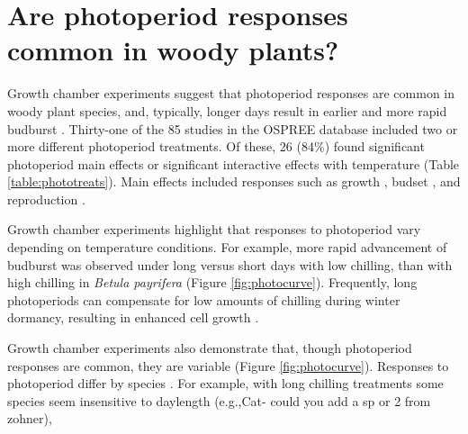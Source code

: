 \documentclass{article}
\begin{document}
\section*{Are photoperiod responses common in woody plants?}
\par Growth chamber experiments suggest that photoperiod responses are common in woody plant species, and, typically, longer days result in earlier and more rapid budburst \citep [e.g., ][]{Caffarra:2011a}. Thirty-one of the 85 studies in the OSPREE database included two or more different photoperiod treatments. Of these, 26 (84\%) found significant photoperiod main effects or significant interactive effects with temperature (Table \ref{table:phototreats}). Main effects included responses such as growth \citep[e.g., higher growth rates with longer days ][]{Ashby:1962aa}, budset \citep[e.g., more rapid induction of budset with shorter days][]{Howe:1995aa}, and reproduction \citep[e.g., increased flowering with longer days ][]{Heide:2012aa}. 
\par Growth chamber experiments highlight that responses to photoperiod vary depending on temperature conditions. For example, more rapid advancement of budburst was observed under long versus short days with low chilling, than with high chilling in \emph{Betula payrifera} \citep{Hawkins:2012} (Figure \ref{fig:photocurve}). Frequently, long photoperiods can compensate for low amounts of chilling during winter dormancy, resulting in enhanced cell growth \citep{Heide:1993,Myking:1995,Caffarra:2011b}.
\par Growth chamber experiments also demonstrate that, though photoperiod responses are common, they are variable (Figure \ref{fig:photocurve}). Responses to photoperiod differ by species \citep[e.g.,][]{Heide:1993a,Howe:1996,Basler:2012, Basler:2014aa,zohner2016,flynn2018}. %
For example, with long chilling treatments some species seem insensitive to daylength (e.g.,Cat- could you add a sp or 2 from zohner), %
\end{document}
